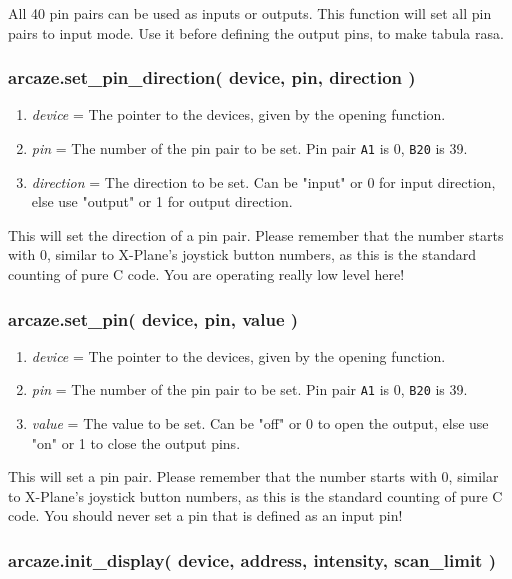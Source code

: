 \documentclass[11pt,parskip=half,a4paper]{scrartcl}
\begin{document}
All 40 pin pairs can be used as inputs or outputs. This function will set all pin pairs to input mode. Use it before defining the output pins, to make tabula rasa.


\subsubsection{arcaze.set\_pin\_direction( device, pin, direction )}

\begin{enumerate}
\item \emph{device} = The pointer to the devices, given by the opening function.
\item \emph{pin} = The number of the pin pair to be set. Pin pair \verb|A1| is 0, \verb|B20| is 39.
\item \emph{direction} = The direction to be set. Can be "input" or 0 for input direction, else use "output" or 1 for output direction.
\end{enumerate}

This will set the direction of a pin pair. Please remember that the number starts with 0, similar to X-Plane's joystick button numbers, as this is the standard counting of pure C code. You are operating really low level here!


\subsubsection{arcaze.set\_pin( device, pin, value )}

\begin{enumerate}
\item \emph{device} = The pointer to the devices, given by the opening function.
\item \emph{pin} = The number of the pin pair to be set. Pin pair \verb|A1| is 0, \verb|B20| is 39.
\item \emph{value} = The value to be set. Can be "off" or 0 to open the output, else use "on" or 1 to close the output pins.
\end{enumerate}

This will set a pin pair. Please remember that the number starts with 0, similar to X-Plane's joystick button numbers, as this is the standard counting of pure C code. You should never set a pin that is defined as an input pin!


\subsubsection{arcaze.init\_display( device, address, intensity, scan\_limit )}
\end{document}
